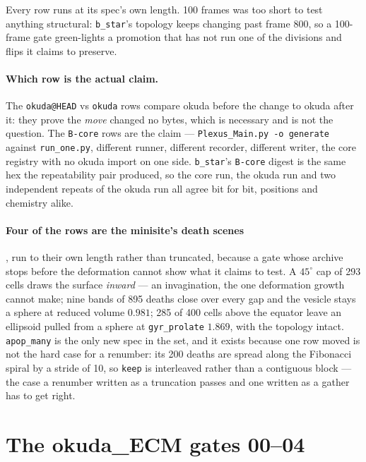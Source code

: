 \documentclass[11pt,a4paper]{article}
\newcommand{\code}[1]{\texttt{\small #1}}
\begin{document}
\twintable

\noindent Every row runs at its spec's own length. 100 frames was too short to test anything
structural: \code{b\_star}'s topology keeps changing past frame 800, so a 100-frame gate green-lights
a promotion that has not run one of the divisions and flips it claims to preserve.

\paragraph{Which row is the actual claim.} The \code{okuda@HEAD} vs \code{okuda} rows compare okuda
before the change to okuda after it: they prove the \emph{move} changed no bytes, which is necessary
and is not the question. The \code{B-core} rows are the claim --- \code{Plexus\_Main.py -o generate}
against \code{run\_one.py}, different runner, different recorder, different writer, the core registry
with no okuda import on one side. \code{b\_star}'s \code{B-core} digest is the same hex the
repeatability pair produced, so the core run, the okuda run and two independent repeats of the okuda
run all agree bit for bit, positions and chemistry alike.

\paragraph{Four of the rows are the minisite's death scenes}, run to their own length rather than
truncated, because a gate whose archive stops before the deformation cannot show what it claims to
test. A $45^\circ$ cap of 293 cells draws the surface \emph{inward} --- an invagination, the one
deformation growth cannot make; nine bands of 895 deaths close over every gap and the vesicle stays a
sphere at reduced volume $0.981$; 285 of 400 cells above the equator leave an ellipsoid pulled from a
sphere at \code{gyr\_prolate} $1.869$, with the topology intact. \code{apop\_many} is the only new
spec in the set, and it exists because one row moved is not the hard case for a renumber: its 200
deaths are spread along the Fibonacci spiral by a stride of 10, so \code{keep} is interleaved rather
than a contiguous block --- the case a renumber written as a truncation passes and one written as a
gather has to get right.

\section{The okuda\_ECM gates 00--04}\label{sec:gates}
\end{document}
